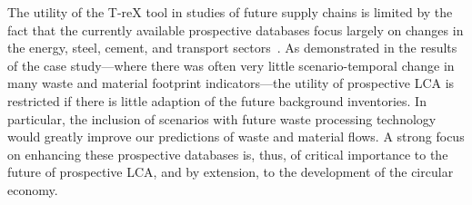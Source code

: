 The utility of the T-reX tool in studies of future supply chains is limited by the fact that the currently available prospective databases focus largely on changes in the energy, steel, cement, and transport sectors~\citep{sacchi2023premisedocs}. As demonstrated in the results of the case study---where there was often very little scenario-temporal change in many waste and material footprint indicators---the utility of prospective LCA is restricted if there is little adaption of the future background inventories. In particular, the inclusion of scenarios with future waste processing technology would greatly improve our predictions of waste and material flows. A strong focus on enhancing these prospective databases is, thus, of critical importance to the future of prospective LCA, and by extension, to the development of the circular economy. 
